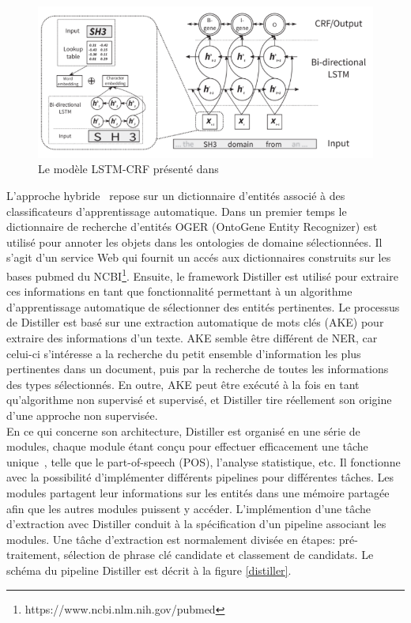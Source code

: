 \begin{figure}[!ht]
\begin{center}
	\includegraphics[width=1\textwidth]{Figures/LSTMCRF.PNG}
\end{center}
\label{LSTMCRF} 
\caption[Le modèle LSTM-CRF]{Le modèle LSTM-CRF présenté dans \cite{Habibi2017a}}
\end{figure}

L'approche hybride~\cite{Basaldella2017} repose sur un dictionnaire d'entités associé à des classificateurs d'apprentissage automatique. Dans un premier temps le dictionnaire de recherche d’entités OGER (OntoGene Entity Recognizer) est utilisé pour annoter les objets dans les ontologies de domaine sélectionnées. Il s'agit d'un service Web qui fournit un accés aux dictionnaires construits sur les bases pubmed du NCBI\footnote{https://www.ncbi.nlm.nih.gov/pubmed}. Ensuite, le framework Distiller est utilisé pour extraire ces informations en tant que fonctionnalité permettant à un algorithme d’apprentissage automatique de sélectionner des entités pertinentes. Le processus de Distiller est basé sur une extraction automatique de mots clés (AKE) pour extraire des informations d’un texte. AKE semble être différent de NER, car celui-ci s'intéresse a la recherche du petit ensemble d'information les plus pertinentes dans un document, puis par la recherche de toutes les informations des types sélectionnés. En outre, AKE peut être exécuté à la fois en tant qu’algorithme non supervisé et supervisé, et Distiller tire réellement son origine d’une approche non supervisée. \\
En ce qui concerne son architecture, Distiller est organisé en une série de modules, chaque module étant conçu pour effectuer efficacement une tâche unique~\cite{basaldella2015introducing}, telle que le part-of-speech (POS), l'analyse statistique, etc. Il fonctionne avec la possibilité d'implémenter différents pipelines pour différentes tâches. Les modules partagent leur informations sur les entités dans une mémoire partagée afin que les autres modules puissent y accéder. L'implémention d'une tâche d'extraction avec Distiller conduit à la spécification d'un pipeline associant les modules. Une tâche d'extraction est normalement divisée en étapes: pré-traitement, sélection de phrase clé candidate et classement de candidats. Le schéma du pipeline Distiller est décrit à la figure \ref{distiller}.

